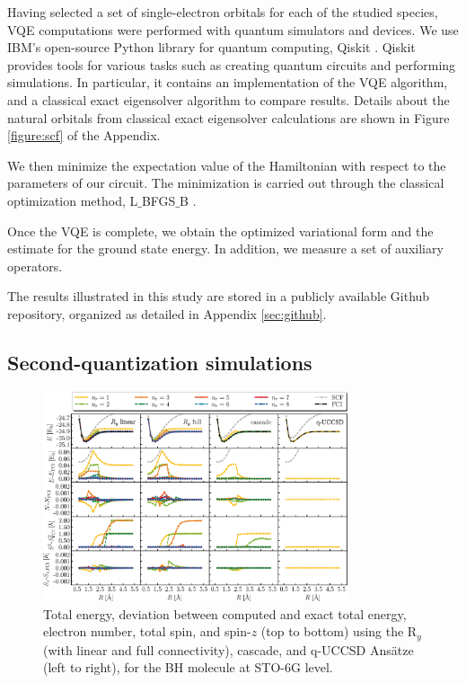 \documentclass[aps,pra,onecolumn]{revtex4-2}
\begin{document}
Having selected a set of single-electron orbitals for each of the studied species, VQE computations were performed with quantum simulators and devices. 
We use IBM's open-source Python library for quantum computing, Qiskit \cite{aleksandrowicz2019qiskit}. 
Qiskit provides tools for various tasks such as creating quantum circuits and performing simulations. 
In particular, it contains an implementation of the VQE algorithm, and a classical exact eigensolver algorithm to compare results.
Details about the natural orbitals from classical exact eigensolver calculations are shown in Figure \ref{figure:scf} of the Appendix.

We then minimize the expectation value of the Hamiltonian with respect to the parameters of our circuit. 
The minimization is carried out through the classical optimization method, L$\_$BFGS$\_$B \cite{zhu1997algorithm,byrd1995limited,morales2011remark}.

Once the VQE is complete, we obtain the optimized variational form and the estimate for the ground state energy. 
In addition, we measure a set of auxiliary operators.

The results illustrated in this study are stored in a publicly available Github repository, organized as detailed in Appendix \ref{sec:github}.

\subsection{Second-quantization simulations}

\begin{figure}[t!]
\includegraphics[width=0.8\textwidth]{../figures/second_quantization_bh/second_quantization_bh.eps}
\caption{Total energy, deviation between computed and exact total energy, electron number, total spin, and spin-$z$ (top to bottom) 
using the R$_y$ (with linear and full connectivity), cascade, and q-UCCSD Ans\"{a}tze (left to right), for the BH molecule at STO-6G level.
}
\label{figure:second_bh}
\end{figure}
\end{document}

